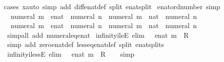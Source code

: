 \begin{isabellebody}
%
\endisadelimproof
%
\isatagproof
{}\isamarkupfalse%
{\isacharparenleft}cases\ x{\isacharparenright}{\isacharparenleft}auto\ simp\ add{\isacharcolon}\ diff{\isacharunderscore}enat{\isacharunderscore}def\ split{\isacharcolon}\ enat{\isachardot}split{\isacharparenright}%
\endisatagproof
{\isafoldproof}%
%
\isadelimproof
\isanewline
%
\endisadelimproof
\isanewline
{}\isamarkupfalse%
\ enat{\isacharunderscore}ord{\isacharunderscore}number\ {\isacharbrackleft}simp{\isacharbrackright}{\isacharcolon}\isanewline
\ \ {\isachardoublequoteopen}{\isacharparenleft}numeral\ m\ {\isacharcolon}{\isacharcolon}\ enat{\isacharparenright}\ {\isasymle}\ numeral\ n\ {\isasymlongleftrightarrow}\ {\isacharparenleft}numeral\ m\ {\isacharcolon}{\isacharcolon}\ nat{\isacharparenright}\ {\isasymle}\ numeral\ n{\isachardoublequoteclose}\isanewline
\ \ {\isachardoublequoteopen}{\isacharparenleft}numeral\ m\ {\isacharcolon}{\isacharcolon}\ enat{\isacharparenright}\ {\isacharless}\ numeral\ n\ {\isasymlongleftrightarrow}\ {\isacharparenleft}numeral\ m\ {\isacharcolon}{\isacharcolon}\ nat{\isacharparenright}\ {\isacharless}\ numeral\ n{\isachardoublequoteclose}\isanewline
%
\isadelimproof
\ \ %
\endisadelimproof
%
\isatagproof
{}\isamarkupfalse%
\ {\isacharparenleft}simp{\isacharunderscore}all\ add{\isacharcolon}\ numeral{\isacharunderscore}eq{\isacharunderscore}enat{\isacharparenright}%
\endisatagproof
{\isafoldproof}%
%
\isadelimproof
\isanewline
%
\endisadelimproof
\isanewline
{}\isamarkupfalse%
\ infinity{\isacharunderscore}ileE\ {\isacharbrackleft}elim{\isacharbang}{\isacharbrackright}{\isacharcolon}\ {\isachardoublequoteopen}{\isasyminfinity}\ {\isasymle}\ enat\ m\ {\isasymLongrightarrow}\ R{\isachardoublequoteclose}\isanewline
%
\isadelimproof
\ \ %
\endisadelimproof
%
\isatagproof
{}\isamarkupfalse%
\ {\isacharparenleft}simp\ add{\isacharcolon}\ zero{\isacharunderscore}enat{\isacharunderscore}def\ less{\isacharunderscore}eq{\isacharunderscore}enat{\isacharunderscore}def\ split{\isacharcolon}\ enat{\isachardot}splits{\isacharparenright}%
\endisatagproof
{\isafoldproof}%
%
\isadelimproof
\isanewline
%
\endisadelimproof
\isanewline
{}\isamarkupfalse%
\ infinity{\isacharunderscore}ilessE\ {\isacharbrackleft}elim{\isacharbang}{\isacharbrackright}{\isacharcolon}\ {\isachardoublequoteopen}{\isasyminfinity}\ {\isacharless}\ enat\ m\ {\isasymLongrightarrow}\ R{\isachardoublequoteclose}\isanewline
%
\isadelimproof
\ \ %
\endisadelimproof
%
\isatagproof
{}\isamarkupfalse%
\ simp%
\endisatagproof

\end{isabellebody}
